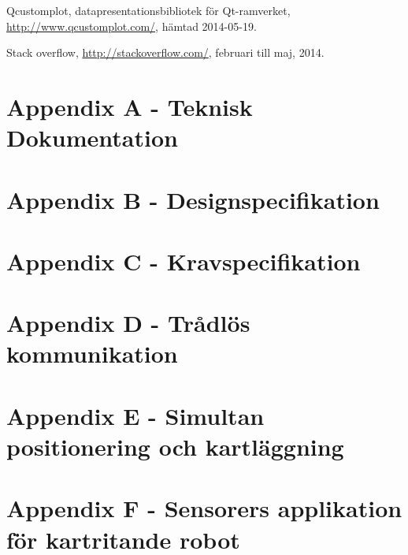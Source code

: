 \documentclass[a4paper,12pt,fleqn]{article}
\begin{document}
Qcustomplot, datapresentationsbibliotek för Qt-ramverket, \url{http://www.qcustomplot.com/}, hämtad 2014-05-19.

Stack overflow, \url{http://stackoverflow.com/}, februari till maj, 2014.



\newpage
\appendix
\pagestyle{empty}
\section*{Appendix A - Teknisk Dokumentation}

\section*{Appendix B - Designspecifikation}

\section*{Appendix C - Kravspecifikation}

\section*{Appendix D - Trådlös kommunikation}
\label{komuppg.}

\section*{Appendix E - Simultan positionering och kartläggning}

\section*{Appendix F - Sensorers applikation för kartritande robot}

\end{document}
